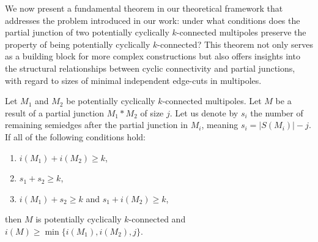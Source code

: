 \documentclass[12pt, twoside]{book}
\begin{document}
We now present a fundamental theorem in our theoretical framework that addresses the problem introduced in our work: under what conditions does the partial junction of two potentially cyclically $k$-connected multipoles preserve the property of being potentially cyclically $k$-connected? This theorem not only serves as a building block for more complex constructions but also offers insights into the structural relationships between cyclic connectivity and partial junctions, with regard to sizes of minimal independent edge-cuts in multipoles.

\begin{theorem}\label{th:connecting-potentially-cyclically-connected-with-number-of-resulting-semiedges}
	Let $M_1$ and $M_2$ be potentially cyclically $k$-connected multipoles. Let $M$ be a result of a partial junction $M_1*M_2$ of size $j$. Let us denote by $s_i$ the number of remaining semiedges after the partial junction in $M_i$, meaning ${s_i=|S(M_i)|-j}$. If all of the following conditions hold:
	\begin{enumerate}[label=(\roman*)]
		\item $i(M_1)+i(M_2)\geq k$,
		\item $s_1+s_2\geq k$,
		\item $i(M_1)+s_2\geq k$ and $s_1+i(M_2)\geq k$,
	\end{enumerate}
	then $M$ is potentially cyclically $k$-connected and $i(M)\geq \min\{i(M_1), i(M_2), j\}$.
\end{theorem}
\end{document}
